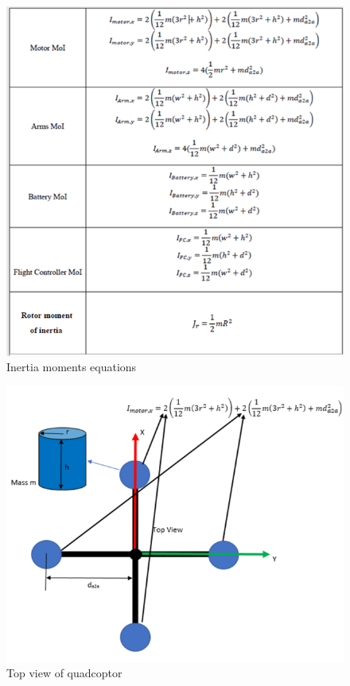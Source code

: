 \begin{figure}[H]
\begin{center}
   \includegraphics[scale =0.87]{pictures/control/inertia tables table.png}
\end{center}
\caption{Inertia moments equations}
\end{figure}

\begin{figure}[H]
\begin{center}
   \includegraphics[scale =1]{pictures/control/Drone view inertiacalc.png}
\end{center}
\caption{Top view of quadcoptor}
\end{figure}

